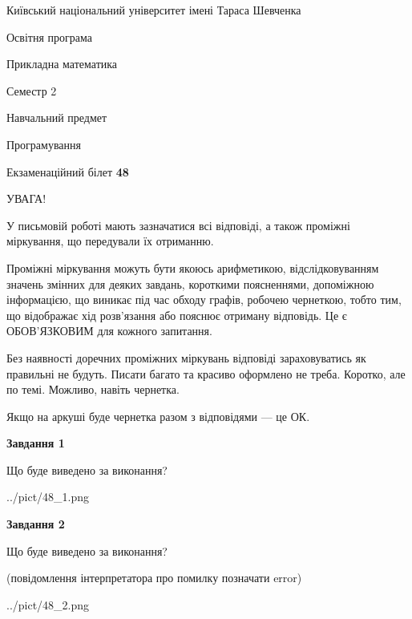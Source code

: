 \documentclass[12pt, ukrainian]{article}
\begin{document}
{{\begin {small}\par
{ \center  Київський національний університет імені Тараса Шевченка \par}
{\parbox {5 cm}{Освітня програма \hfill}{\parbox {7 cm}{Прикладна математика\hfill}}\parbox {6 cm}{\hfill Семестр 2}}\par
{\parbox {5 cm} {Навчальний предмет \hfill}\parbox {7 cm}{Програмування \hfill}\parbox {6cm}{\hfill}\par}\vspace{-7pt} \end{small}}{\center Екзаменаційний білет \No \textbf
{ 48 }\par}}
{
\begin {large}
УВАГА!

У письмовій роботі мають зазначатися всі відповіді, а також проміжні міркування, що передували їх отриманню.

Проміжні міркування можуть бути якоюсь арифметикою, відслідковуванням зна\-чень змінних для деяких завдань,
короткими поясненнями, допоміжною інформацією, що виникає під час обходу графів, робочею чернеткою,
тобто тим, що відображає хід розв’язання або пояснює отриману відповідь.
Це є ОБОВ’ЯЗКОВИМ для кожного запитання.

Без наявності доречних проміжних міркувань відповіді зараховуватись як правиль\-ні не будуть.
Писати багато та красиво оформлено не треба. Коротко, але по темі. Можли\-во, навіть чернетка.

Якщо на аркуші буде чернетка разом з відповідями --- це ОК.

\newpage

{\begin {center}\textbf{Завдання 1}\end {center}}\par
Що буде виведено за виконання?\par
\begin{center}
	{../pict/48_1.png}
\end{center}
\newpage

{\begin {center}\textbf{Завдання 2}\end {center}}\par
Що буде виведено за виконання?\par
 (повідомлення інтерпретатора про помилку позначати error)\par
\begin{center}
	{../pict/48_2.png}
\end{center}
\newpage


\end{large}}
\end{document}
